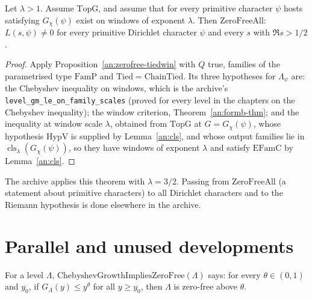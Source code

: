 \begin{theorem}\label{an:zerofreeall-topg}
Let $\lambda>1$. Assume $\mathrm{TopG}$, and assume that for every
primitive character $\psi$ hosts satisfying $G_{\chi}(\psi)$ exist on windows
of exponent $\lambda$. Then $\mathrm{ZeroFreeAll}$: $L(s,\psi)\ne0$ for
every primitive Dirichlet character $\psi$ and every $s$ with $\Re s>1/2$.
\end{theorem}
\begin{proof}
Apply Proposition~\ref{an:zerofree-tiedwin} with $Q$ true, families of the
parametrised type $\mathrm{FamP}$ and $\mathrm{Tied}=\mathrm{ChainTied}$.
Its three hypotheses for $\Lambda_{\psi}$ are: the Chebyshev inequality on
windows, which is the archive's
\texttt{level\_gm\_le\_on\_family\_scales} (proved for every level in the
chapters on the Chebyshev inequality); the window criterion,
Theorem~\ref{an:formb-thm}; and the inequality at window scale
$\lambda$, obtained from $\mathrm{TopG}$ at $G=G_{\chi}(\psi)$, whose
hypothesis $\mathrm{HypV}$ is supplied by Lemma~\ref{an:cls}, and whose
output families lie in $\operatorname{cls}_{\lambda}(G_{\chi}(\psi))$, so
they have windows of exponent $\lambda$ and satisfy $\mathrm{EFamC}$ by
Lemma~\ref{an:cls}.
\end{proof}

\begin{remark}
The archive applies this theorem with $\lambda=3/2$. Passing from
$\mathrm{ZeroFreeAll}$ (a statement about primitive characters) to all
Dirichlet characters and to the Riemann hypothesis is done elsewhere in
the archive.
\end{remark}

\section{Parallel and unused developments}

\begin{definition}\label{an:chebgrowth}
For a level $\Lambda$, $\mathrm{ChebyshevGrowthImpliesZeroFree}(\Lambda)$
says: for every $\theta\in(0,1)$ and $y_0$, if $G_{\Lambda}(y)\le y^{\theta}$
for all $y\ge y_0$, then $\Lambda$ is zero-free above $\theta$.
\end{definition}

